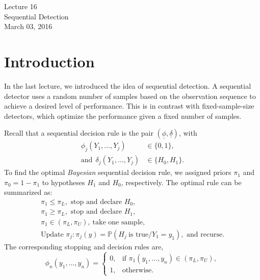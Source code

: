 \documentclass[a4paper,english,12pt]{article}
\newcommand{\spc}{\mathbb{P}}
\begin{document}
		\begin{center}
			\Large{Lecture 16}\\
			\vspace{12pt}
			{\huge{Sequential Detection}}\\
				\vspace{15pt}
					March 03, 2016
		\end{center}
		\vspace{20pt}
		
\section{Introduction}
In the last lecture, we introduced the idea of sequential detection. A sequential detector uses a random number of samples based on the observation sequence to achieve a desired level of performance. This is in contrast with fixed-sample-size detectors, which optimize the performance given a fixed number of samples.
\par Recall that a sequential decision rule is the pair  $(\underline{\phi},\underline{\delta})$, with
\begin{align}
\phi_{j}(Y_{1},\ldots,Y_{j})&\in\{0,1\},\nonumber\\
\text{and}~~\delta_{j}(Y_{1},\ldots,Y_{j})&\in\{H_{0},H_{1}\}.
\end{align}
To find the optimal \textit{Bayesian} sequential decision rule, we assigned priors $\pi_{1}$ and $\pi_{0}=1-\pi_{1}$ to hypotheses $H_{1}$ and $H_{0}$, respectively. The optimal rule can be summarized as:
\begin{gather*}
\pi_{1}\leq\pi_{L},\mbox{ stop and declare $H_{0}$},\\
\pi_{1}\geq\pi_{L}, \mbox{ stop and declare $H_{1}$},\\
\pi_{1}\in(\pi_{L},\pi_{U}),~\mbox{take one sample},\\
\mbox{Update } \pi_{j}:\pi_{j}(y)=\spc(H_{j}~\text{is true}/Y_{1}=y_{1}),\mbox{ and recurse.}
\end{gather*}
The corresponding stopping and decision rules are,
 \begin{equation}
 \phi_{n}(y_{1},\ldots,y_{n})=
 \begin{cases}
 0,& \text{if }\pi_{1}(y_{1},\ldots,y_{n})\in(\pi_{L},\pi_{U}),\\
 1,& \text{otherwise}.
 \end{cases}
 \end{equation}
\end{document}
